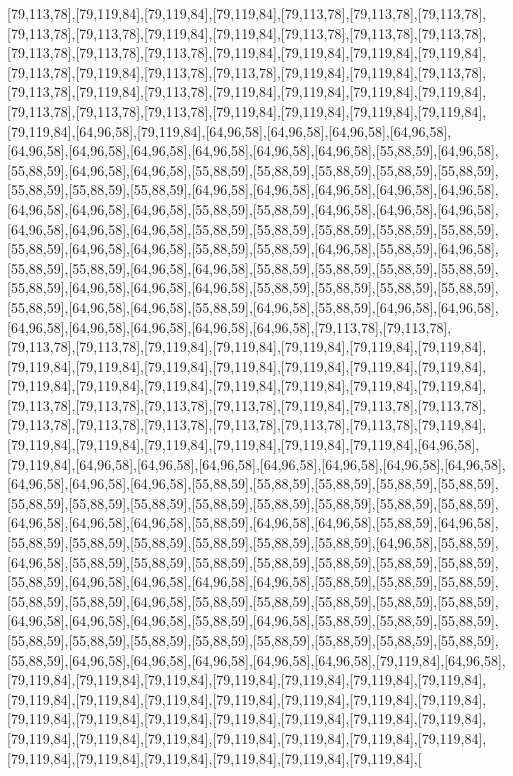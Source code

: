 [79,113,78],[79,119,84],[79,119,84],[79,119,84],[79,113,78],[79,113,78],[79,113,78],[79,113,78],[79,113,78],[79,119,84],[79,119,84],[79,113,78],[79,113,78],[79,113,78],[79,113,78],[79,113,78],[79,113,78],[79,119,84],[79,119,84],[79,119,84],[79,119,84],[79,113,78],[79,119,84],[79,113,78],[79,113,78],[79,119,84],[79,119,84],[79,113,78],[79,113,78],[79,119,84],[79,113,78],[79,119,84],[79,119,84],[79,119,84],[79,119,84],[79,113,78],[79,113,78],[79,113,78],[79,119,84],[79,119,84],[79,119,84],[79,119,84],[79,119,84],[64,96,58],[79,119,84],[64,96,58],[64,96,58],[64,96,58],[64,96,58],[64,96,58],[64,96,58],[64,96,58],[64,96,58],[64,96,58],[64,96,58],[55,88,59],[64,96,58],[55,88,59],[64,96,58],[64,96,58],[55,88,59],[55,88,59],[55,88,59],[55,88,59],[55,88,59],[55,88,59],[55,88,59],[55,88,59],[64,96,58],[64,96,58],[64,96,58],[64,96,58],[64,96,58],[64,96,58],[64,96,58],[64,96,58],[55,88,59],[55,88,59],[64,96,58],[64,96,58],[64,96,58],[64,96,58],[64,96,58],[64,96,58],[55,88,59],[55,88,59],[55,88,59],[55,88,59],[55,88,59],[55,88,59],[64,96,58],[64,96,58],[55,88,59],[55,88,59],[64,96,58],[55,88,59],[64,96,58],[55,88,59],[55,88,59],[64,96,58],[64,96,58],[55,88,59],[55,88,59],[55,88,59],[55,88,59],[55,88,59],[64,96,58],[64,96,58],[64,96,58],[55,88,59],[55,88,59],[55,88,59],[55,88,59],[55,88,59],[64,96,58],[64,96,58],[55,88,59],[64,96,58],[55,88,59],[64,96,58],[64,96,58],[64,96,58],[64,96,58],[64,96,58],[64,96,58],[64,96,58],[79,113,78],[79,113,78],[79,113,78],[79,113,78],[79,119,84],[79,119,84],[79,119,84],[79,119,84],[79,119,84],[79,119,84],[79,119,84],[79,119,84],[79,119,84],[79,119,84],[79,119,84],[79,119,84],[79,119,84],[79,119,84],[79,119,84],[79,119,84],[79,119,84],[79,119,84],[79,119,84],[79,113,78],[79,113,78],[79,113,78],[79,113,78],[79,119,84],[79,113,78],[79,113,78],[79,113,78],[79,113,78],[79,113,78],[79,113,78],[79,113,78],[79,113,78],[79,119,84],[79,119,84],[79,119,84],[79,119,84],[79,119,84],[79,119,84],[79,119,84],[64,96,58],[79,119,84],[64,96,58],[64,96,58],[64,96,58],[64,96,58],[64,96,58],[64,96,58],[64,96,58],[64,96,58],[64,96,58],[64,96,58],[55,88,59],[55,88,59],[55,88,59],[55,88,59],[55,88,59],[55,88,59],[55,88,59],[55,88,59],[55,88,59],[55,88,59],[55,88,59],[55,88,59],[55,88,59],[64,96,58],[64,96,58],[64,96,58],[55,88,59],[64,96,58],[64,96,58],[55,88,59],[64,96,58],[55,88,59],[55,88,59],[55,88,59],[55,88,59],[55,88,59],[55,88,59],[64,96,58],[55,88,59],[64,96,58],[55,88,59],[55,88,59],[55,88,59],[55,88,59],[55,88,59],[55,88,59],[55,88,59],[55,88,59],[64,96,58],[64,96,58],[64,96,58],[64,96,58],[55,88,59],[55,88,59],[55,88,59],[55,88,59],[55,88,59],[64,96,58],[55,88,59],[55,88,59],[55,88,59],[55,88,59],[55,88,59],[64,96,58],[64,96,58],[64,96,58],[55,88,59],[64,96,58],[55,88,59],[55,88,59],[55,88,59],[55,88,59],[55,88,59],[55,88,59],[55,88,59],[55,88,59],[55,88,59],[55,88,59],[55,88,59],[55,88,59],[64,96,58],[64,96,58],[64,96,58],[64,96,58],[64,96,58],[79,119,84],[64,96,58],[79,119,84],[79,119,84],[79,119,84],[79,119,84],[79,119,84],[79,119,84],[79,119,84],[79,119,84],[79,119,84],[79,119,84],[79,119,84],[79,119,84],[79,119,84],[79,119,84],[79,119,84],[79,119,84],[79,119,84],[79,119,84],[79,119,84],[79,119,84],[79,119,84],[79,119,84],[79,119,84],[79,119,84],[79,119,84],[79,119,84],[79,119,84],[79,119,84],[79,119,84],[79,119,84],[79,119,84],[79,119,84],[79,119,84],[79,119,84],[